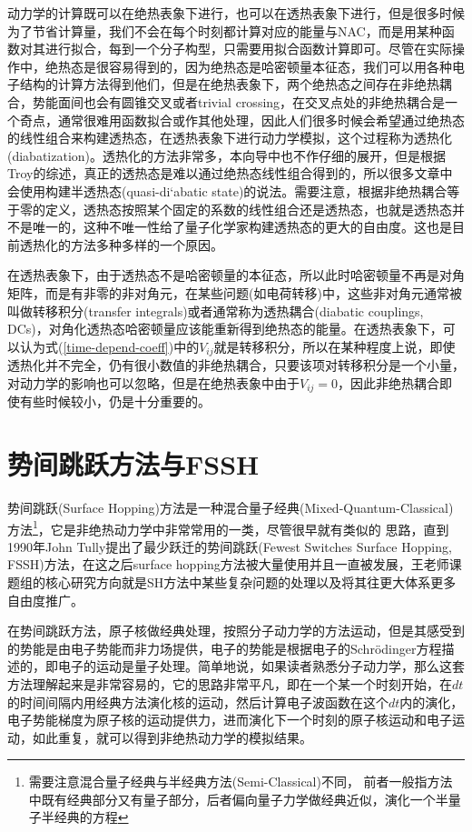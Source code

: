 \documentclass[12pt,a4paper,openany,twoside]{book}
\numberwithin{equation}{section}
\begin{document}
        动力学的计算既可以在绝热表象下进行，也可以在透热表象下进行，但是很多时候为了节省计算量，我们不会在每个时刻都计算对应的能量与NAC，而是用某种函数对其进行拟合，每到一个分子构型，只需要用拟合函数计算即可。尽管在实际操作中，绝热态是很容易得到的，因为绝热态是哈密顿量本征态，我们可以用各种电子结构的计算方法得到他们，但是在绝热表象下，两个绝热态之间存在非绝热耦合，势能面间也会有圆锥交叉或者trivial crossing，在交叉点处的非绝热耦合是一个奇点，通常很难用函数拟合或作其他处理，因此人们很多时候会希望通过绝热态的线性组合来构建透热态，在透热表象下进行动力学模拟，这个过程称为透热化(diabatization)。透热化的方法非常多，本向导中也不作仔细的展开，但是根据Troy的综述，真正的透热态是难以通过绝热态线性组合得到的，所以很多文章中会使用构建半透热态(quasi-di`abatic state)的说法。需要注意，根据非绝热耦合等于零的定义，透热态按照某个固定的系数的线性组合还是透热态，也就是透热态并不是唯一的，这种不唯一性给了量子化学家构建透热态的更大的自由度。这也是目前透热化的方法多种多样的一个原因。

        在透热表象下，由于透热态不是哈密顿量的本征态，所以此时哈密顿量不再是对角矩阵，而是有非零的非对角元，在某些问题(如电荷转移)中，这些非对角元通常被叫做转移积分(transfer integrals)或者通常称为透热耦合(diabatic couplings, DCs)，对角化透热态哈密顿量应该能重新得到绝热态的能量。在透热表象下，可以认为式(\ref{time-depend-coeff})中的$V_{ij}$就是转移积分，所以在某种程度上说，即使透热化并不完全，仍有很小数值的非绝热耦合，只要该项对转移积分是一个小量，对动力学的影响也可以忽略，但是在绝热表象中由于$V_{ij}=0$，因此非绝热耦合即使有些时候较小，仍是十分重要的。
      \section{势间跳跃方法与FSSH}
        势间跳跃(Surface Hopping)方法是一种混合量子经典(Mixed-Quantum-Classical)方法\footnote{需要注意混合量子经典与半经典方法(Semi-Classical)不同，
        前者一般指方法中既有经典部分又有量子部分，后者偏向量子力学做经典近似，演化一个半量子半经典的方程}，它是非绝热动力学中非常常用的一类，尽管很早就有类似的
        思路，直到1990年John Tully提出了最少跃迁的势间跳跃(Fewest Switches Surface Hopping, FSSH)方法\cite{Tully1990}，在这之后surface hopping方法被大量使用并且一直被发展，王老师课题组的核心研究方向就是SH方法中某些复杂问题的处理以及将其往更大体系更多自由度推广。

        在势间跳跃方法，原子核做经典处理，按照分子动力学的方法运动，但是其感受到的势能是由电子势能而非力场提供，电子的势能是根据电子的Schr\"odinger方程描述的，即电子的运动是量子处理。简单地说，如果读者熟悉分子动力学，那么这套方法理解起来是非常容易的，它的思路非常平凡，即在一个某一个时刻开始，在$dt$的时间间隔内用经典方法演化核的运动，然后计算电子波函数在这个$dt$内的演化，电子势能梯度为原子核的运动提供力，进而演化下一个时刻的原子核运动和电子运动，如此重复，就可以得到非绝热动力学的模拟结果。
\end{document}
